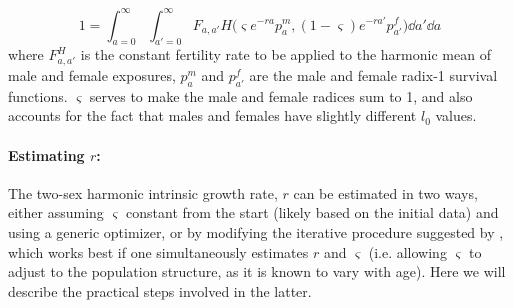 \begin{equation}
\label{eq:lotkaH}
1 = \int _{a=0}^\infty \int _{a'=0}^\infty F_{a,a'} H\Big(\varsigma
e^{-ra}p_a^m, (1-\varsigma)e^{-ra'}p_{a'}^f\Big)\dd a' \dd a
\end{equation}
where $F_{a,a'}^H$ is the constant fertility rate to be applied to the harmonic
mean of male and female exposures, $p_a^m$ and $p_{a'}^f$ are the male
and female radix-1 survival functions. $\varsigma$ serves to make the
male and female radices sum to 1, and also accounts for the fact that males and
females have slightly different $l_0$ values. 

\paragraph{Estimating $r$: } The two-sex harmonic intrinsic growth rate, $r$ can
be estimated in two ways, either assuming $\varsigma$ constant from the start
(likely based on the initial data) and using a generic optimizer, or by modifying the iterative procedure
suggested by \citet{coale1957new}, which works best if one simultaneously
estimates $r$ and $\varsigma$ (i.e. allowing $\varsigma$ to adjust to the
population structure, as it is known to vary with age). Here we will describe
the practical steps involved in the latter.

